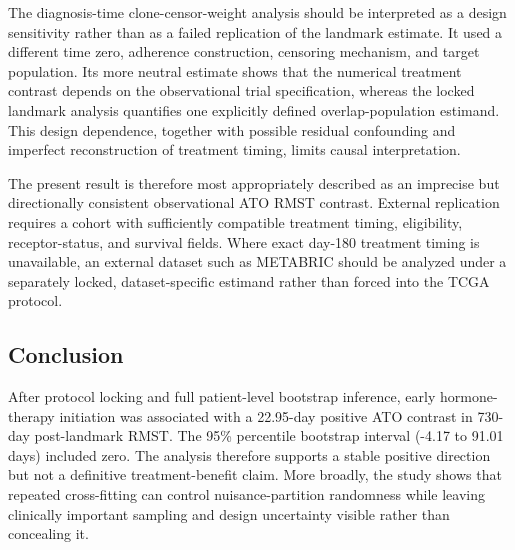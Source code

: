 The diagnosis-time clone-censor-weight analysis should be interpreted as a design sensitivity rather than as a failed replication of the landmark estimate. It used a different time zero, adherence construction, censoring mechanism, and target population. Its more neutral estimate shows that the numerical treatment contrast depends on the observational trial specification, whereas the locked landmark analysis quantifies one explicitly defined overlap-population estimand. This design dependence, together with possible residual confounding and imperfect reconstruction of treatment timing, limits causal interpretation.

The present result is therefore most appropriately described as an imprecise but directionally consistent observational ATO RMST contrast. External replication requires a cohort with sufficiently compatible treatment timing, eligibility, receptor-status, and survival fields. Where exact day-180 treatment timing is unavailable, an external dataset such as METABRIC should be analyzed under a separately locked, dataset-specific estimand rather than forced into the TCGA protocol.

\subsection{Conclusion}

After protocol locking and full patient-level bootstrap inference, early hormone-therapy initiation was associated with a 22.95-day positive ATO contrast in 730-day post-landmark RMST. The 95\% percentile bootstrap interval (-4.17 to 91.01 days) included zero. The analysis therefore supports a stable positive direction but not a definitive treatment-benefit claim. More broadly, the study shows that repeated cross-fitting can control nuisance-partition randomness while leaving clinically important sampling and design uncertainty visible rather than concealing it.
